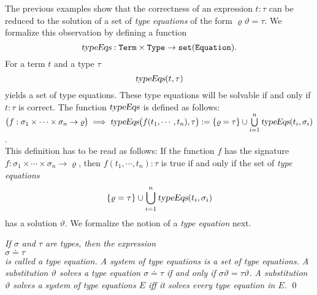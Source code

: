 The previous examples show that the correctness of an expression
$t: \tau$ can be reduced to the solution of a set of  \emph{type equations} of the form
$\varrho \vartheta = \tau$.
We formalize this observation by defining a function 
\[ \textsl{typeEqs}: \mathtt{Term} \times \mathtt{Type} \rightarrow \mathtt{set}(\mathtt{Equation}). \]
For a term $t$ and a  type $\tau$ 
\[ \textsl{typeEqs}(t, \tau) \]
yields a set of type equations.  These type equations will be solvable if and only if
 $t: \tau$ is correct.
The function $\textsl{typeEqs}$ is defined as follows:
\\[0.2cm]
\hspace*{1.3cm}
$\bigl(f: \sigma_1 \times \cdots \times \sigma_n \rightarrow \varrho\bigr) \;\Longrightarrow\;
 \textsl{typeEqs}\bigl( f(t_1,\cdots,t_n), \tau \bigr) := 
   \{ \varrho = \tau \} \cup \bigcup\limits_{i=1}^n \textsl{typeEqs}(t_i, \sigma_i)$.
\\[0.2cm]
This definition has to be read as follows:  If the function  $f$ has the signature
$f: \sigma_1 \times \cdots \times \sigma_n \rightarrow \varrho$, 
then  $f(t_1, \cdots, t_n): \tau$ is true if and only if the set of \emph{type equations}
\[ \{ \varrho = \tau \} \cup \bigcup\limits_{i=1}^n \textsl{typeEqs}(t_i, \sigma_i) \]
has a solution $\vartheta$.  We formalize the notion of a \emph{type equation} next.


\begin{Definition}
{\em
If $\sigma$ and $\tau$ are types, then the expression
\\[0.2cm]
\hspace*{1.3cm}
$\sigma \doteq \tau$
\\[0.2cm]
is called a \emph{type equation}.  A \emph{system of type equations} is a set of type
equations. A substitution $\vartheta$ \emph{solves} a type equation
 $\sigma \doteq \tau$ if and only if $\sigma\vartheta = \tau\vartheta$.  A substitution
 $\vartheta$ solves a system of type equations $E$ iff it solves every type equation in $E$.
}
\qed
\end{Definition}

